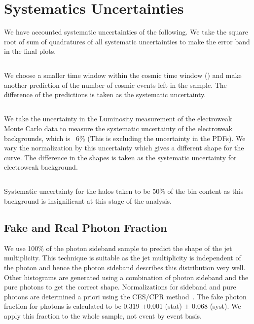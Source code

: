 \documentclass[11pt]{article}
\begin{document}
\section{Systematics Uncertainties}

We have accounted systematic uncertainties of the following. We take the square root of sum of quadratures of all systematic uncertainties to make the error band in the final plots.

\subsection{\cosmicjets}
We choose a smaller time window within the cosmic time window (\cosmictimewindow) and make another prediction of the number of cosmic events left in the sample. The difference of the predictions is taken as the systematic uncertainty.   

\subsection{\elejets}
We take the uncertainty in the Luminosity measurement of the electroweak Monte Carlo data to measure the systematic uncertainty of the electroweak backgrounds, which is ~6\% (This is excluding the uncertainty in the PDFs). We vary the normalization by this uncertainty which gives a different shape for the curve. The difference in the shapes is taken as the systematic uncertainty for electroweak background.

\subsection{\halojets}
Systematic uncertainty for the halos taken to be 50\%  of the bin content as this background is insignificant at this stage of the analysis.


\subsection{Fake and Real Photon Fraction}
We use 100\% of the photon sideband sample to predict the shape of the jet multiplicity. This technique is suitable as the jet multiplicity is independent of the photon \et and hence the photon sideband describes this distribution very well. Other histograms are generated using a combination of photon sideband and the pure photons to get the correct shape. Normalizations for sideband and pure photons are determined a priori using the CES/CPR method~\cite{wwwCESCPR}. The fake photon fraction for photons  is calculated to be 0.319 $\pm$0.001 (stat) $\pm$ 0.068 (syst). We apply this fraction to the whole sample, not event by event basis.
\end{document}
